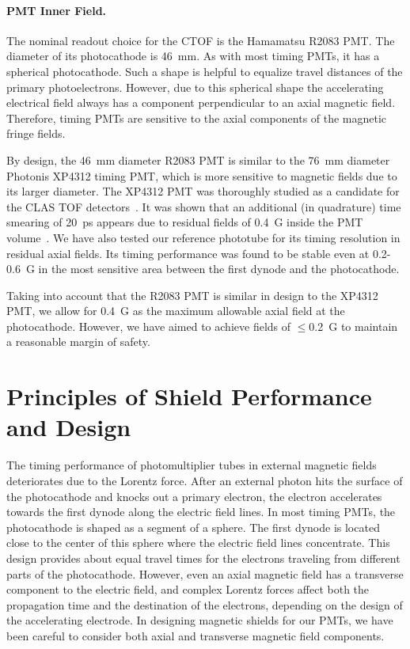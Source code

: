 \documentclass[12pt]{article}
\begin{document}
\paragraph{PMT Inner Field.}
The nominal readout choice for the CTOF is the Hamamatsu R2083 PMT. The diameter 
of its photocathode is 46~mm. As with most timing PMTs, it has a spherical 
photocathode. Such a shape is helpful to equalize travel distances of the primary 
photoelectrons. However, due to this spherical shape the accelerating electrical 
field always has a component perpendicular to an axial magnetic field. Therefore, 
timing PMTs are sensitive to the axial components of the magnetic fringe fields.

By design, the 46~mm diameter R2083 PMT is similar to the 76~mm diameter Photonis
XP4312 timing PMT, which is more sensitive to magnetic fields due to its larger 
diameter. The XP4312 PMT was thoroughly studied as a candidate for the CLAS TOF 
detectors~\cite{r2}. It was shown that an additional (in quadrature) time smearing 
of 20~ps appears due to residual fields of 0.4~G inside the PMT volume~\cite{flint}. 
We have also tested our reference phototube for its timing resolution in residual 
axial fields. Its timing performance was found to be stable even at 0.2-0.6~G in 
the most sensitive area between the first dynode and the photocathode.

Taking into account that the R2083 PMT is similar in design to the XP4312 PMT,
we allow for 0.4~G as the maximum allowable axial field at the photocathode.
However, we have aimed to achieve fields of $\leq$0.2~G to maintain a reasonable 
margin of safety.

\section{Principles of Shield Performance and Design}
\label{sec:principles}
 
The timing performance of photomultiplier tubes in external magnetic fields 
deteriorates due to the Lorentz force. After an external photon hits the surface 
of the photocathode and knocks out a primary electron, the electron accelerates 
towards the first dynode along the electric field lines. In most timing PMTs, the 
photocathode is shaped as a segment of a sphere. The first dynode is located close 
to the center of this sphere where the electric field lines concentrate. This
design provides about equal travel times for the electrons traveling from different 
parts of the photocathode. However, even an axial magnetic field has a transverse 
component to the electric field, and complex Lorentz forces affect both the 
propagation time and the destination of the electrons, depending on the design of 
the accelerating electrode. In designing magnetic shields for our PMTs, we have
been careful to consider both axial and transverse magnetic field components.
\end{document}
